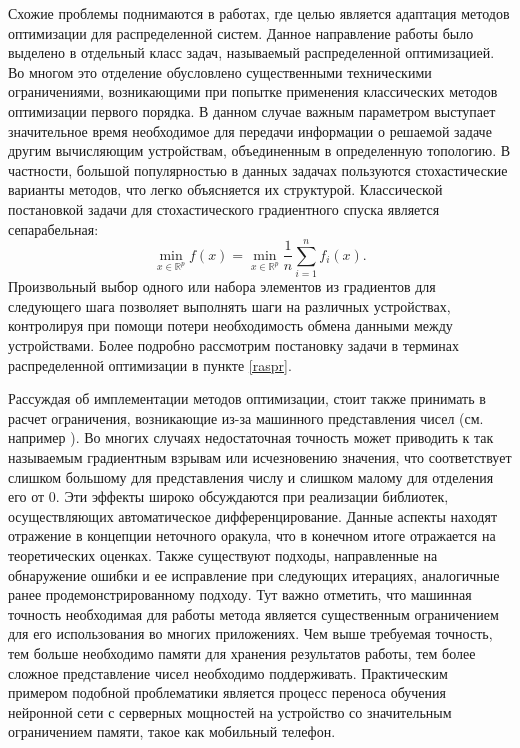   Схожие проблемы поднимаются в работах, где целью является адаптация методов оптимизации для распределенной систем. Данное направление работы было выделено в отдельный класс задач, называемый распределенной оптимизацией. Во многом это отделение обусловлено существенными техническими ограничениями, возникающими при попытке применения классических методов оптимизации первого порядка. В данном случае важным параметром выступает значительное время необходимое для передачи информации о решаемой задаче другим вычисляющим устройствам, объединенным в определенную топологию. В частности, большой популярностью в данных задачах пользуются стохастические варианты методов, что легко объясняется их структурой. Классической постановкой задачи для стохастического градиентного спуска является сепарабельная:
  $$
  \min_{x \in \mathbb{R}^p} f(x) = \min_{x \in \mathbb{R}^p}\frac{1}{n} \sum_{i=1}^n f_i(x).
  $$
  Произвольный выбор одного или набора элементов из градиентов для следующего шага позволяет выполнять шаги на различных устройствах, контролируя при помощи потери необходимость обмена данными между устройствами. Более подробно рассмотрим постановку задачи в терминах распределенной оптимизации в пункте \ref{raspr}. 
  
  Рассуждая об имплементации методов оптимизации, стоит также принимать в расчет ограничения, возникающие из-за машинного представления чисел (см. например \cite{low_prec_grad, low_prec_train}). Во многих случаях недостаточная точность может приводить к так называемым градиентным взрывам или исчезновению значения, что соответствует слишком большому для представления числу и слишком малому для отделения его от 0. Эти эффекты широко обсуждаются при реализации библиотек, осуществляющих автоматическое дифференцирование. Данные аспекты находят отражение в концепции неточного оракула, что в конечном итоге отражается на теоретических оценках. Также существуют подходы, направленные на обнаружение ошибки и ее исправление при следующих итерациях, аналогичные ранее продемонстрированному подходу. Тут важно отметить, что машинная точность необходимая для работы метода является существенным ограничением для его использования во многих приложениях. Чем выше требуемая точность, тем больше необходимо памяти для хранения результатов работы, тем более сложное представление чисел необходимо поддерживать. Практическим примером подобной проблематики является процесс переноса обучения нейронной сети с серверных мощностей на устройство со значительным ограничением памяти, такое как мобильный телефон. \cite{progeressive_low_precision, high_acc_low}


